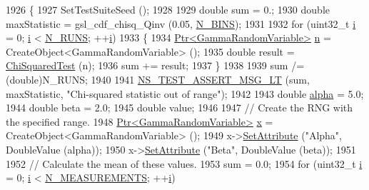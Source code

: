 \begin{DoxyCode}
1926 \{
1927   SetTestSuiteSeed ();
1928 
1929   \textcolor{keywordtype}{double} sum = 0.;
1930   \textcolor{keywordtype}{double} maxStatistic = gsl\_cdf\_chisq\_Qinv (0.05, \hyperlink{classRandomVariableStreamGammaTestCase_ab4a9effbc835a0a3ed7925cf79b09c61}{N\_BINS});
1931 
1932   \textcolor{keywordflow}{for} (uint32\_t \hyperlink{bernuolliDistribution_8m_a6f6ccfcf58b31cb6412107d9d5281426}{i} = 0; \hyperlink{bernuolliDistribution_8m_a6f6ccfcf58b31cb6412107d9d5281426}{i} < \hyperlink{classRandomVariableStreamGammaTestCase_ab9ff0c8326bbfb837ccec51ae309b855}{N\_RUNS}; ++\hyperlink{bernuolliDistribution_8m_a6f6ccfcf58b31cb6412107d9d5281426}{i})
1933     \{
1934       \hyperlink{classns3_1_1Ptr}{Ptr<GammaRandomVariable>} \hyperlink{namespacesample-rng-plot_aeb5ee5c431e338ef39b7ac5431242e1d}{n} = CreateObject<GammaRandomVariable> ();
1935       \textcolor{keywordtype}{double} result = \hyperlink{classRandomVariableStreamGammaTestCase_a8330d92cb8a848f05abfa4ab429f4ab4}{ChiSquaredTest} (n);
1936       sum += result;
1937     \}
1938 
1939   sum /= (double)N\_RUNS;
1940 
1941   \hyperlink{group__testing_ga1d96848b91407c9a0b36583e8b0ad7ae}{NS\_TEST\_ASSERT\_MSG\_LT} (sum, maxStatistic, \textcolor{stringliteral}{"Chi-squared statistic out of range"});
1942 
1943   \textcolor{keywordtype}{double} \hyperlink{lte__uplink__power__control_8m_a62197192f0fbf4e0675eb37be1c4c175}{alpha} = 5.0;
1944   \textcolor{keywordtype}{double} beta = 2.0;
1945   \textcolor{keywordtype}{double} value;
1946 
1947   \textcolor{comment}{// Create the RNG with the specified range.}
1948   \hyperlink{classns3_1_1Ptr}{Ptr<GammaRandomVariable>} \hyperlink{lte__link__budget__x2__handover__measures_8m_a9336ebf25087d91c818ee6e9ec29f8c1}{x} = CreateObject<GammaRandomVariable> ();
1949   x->\hyperlink{classns3_1_1ObjectBase_ac60245d3ea4123bbc9b1d391f1f6592f}{SetAttribute} (\textcolor{stringliteral}{"Alpha"}, DoubleValue (alpha));
1950   x->\hyperlink{classns3_1_1ObjectBase_ac60245d3ea4123bbc9b1d391f1f6592f}{SetAttribute} (\textcolor{stringliteral}{"Beta"}, DoubleValue (beta));
1951 
1952   \textcolor{comment}{// Calculate the mean of these values.}
1953   sum = 0.0;
1954   \textcolor{keywordflow}{for} (uint32\_t \hyperlink{bernuolliDistribution_8m_a6f6ccfcf58b31cb6412107d9d5281426}{i} = 0; \hyperlink{bernuolliDistribution_8m_a6f6ccfcf58b31cb6412107d9d5281426}{i} < \hyperlink{classRandomVariableStreamGammaTestCase_a7a498087c9e38b217f8253981df88c6d}{N\_MEASUREMENTS}; ++\hyperlink{bernuolliDistribution_8m_a6f6ccfcf58b31cb6412107d9d5281426}{i})

\end{DoxyCode}
